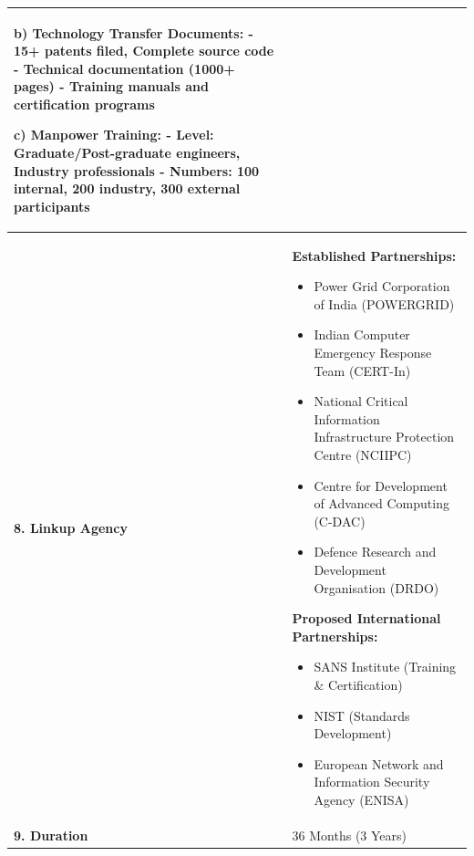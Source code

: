 \documentclass[12pt,a4paper]{article}
\begin{document}
\begin{longtable}{|p{3cm}|p{12cm}|}
\textbf{b) Technology Transfer Documents:}
- 15+ patents filed, Complete source code
- Technical documentation (1000+ pages)
- Training manuals and certification programs

\textbf{c) Manpower Training:}
- Level: Graduate/Post-graduate engineers, Industry professionals
- Numbers: 100 internal, 200 industry, 300 external participants \\
\hline

\textbf{8. Linkup Agency} & 
\textbf{Established Partnerships:}
\begin{itemize}[leftmargin=1em]
    \item Power Grid Corporation of India (POWERGRID)
    \item Indian Computer Emergency Response Team (CERT-In)
    \item National Critical Information Infrastructure Protection Centre (NCIIPC)
    \item Centre for Development of Advanced Computing (C-DAC)
    \item Defence Research and Development Organisation (DRDO)
\end{itemize}

\textbf{Proposed International Partnerships:}
\begin{itemize}[leftmargin=1em]
    \item SANS Institute (Training \& Certification)
    \item NIST (Standards Development)
    \item European Network and Information Security Agency (ENISA)
\end{itemize} \\
\hline

\textbf{9. Duration} & 36 Months (3 Years) \\
\hline

\end{longtable}

\newpage
\end{document}
